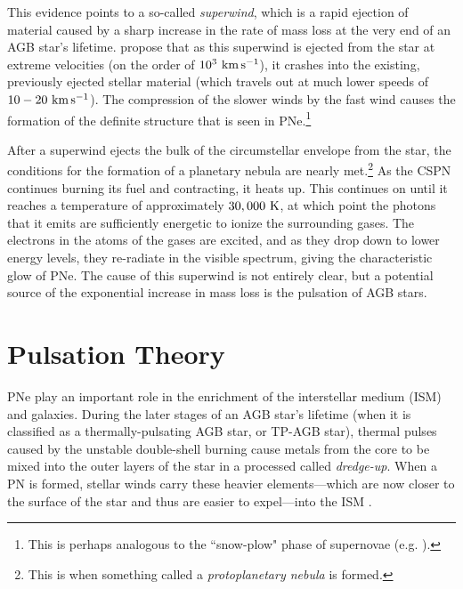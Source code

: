 \documentclass[twocolumn]{aastex63}
\begin{document}
This evidence points to a so-called \textit{superwind}, which is a rapid ejection of material caused by a sharp increase in the rate of mass loss at the very end of an AGB star's lifetime. \cite{kwok1978} propose that as this superwind is ejected from the star at extreme velocities (on the order of $10^{3}~{\rm km\,s^{-1}}$), it crashes into the existing, previously ejected stellar material (which travels out at much lower speeds of $10-20~{\rm km\,s^{-1}}$). The compression of the slower winds by the fast wind causes the formation of the definite structure that is seen in PNe.\footnote{This is perhaps analogous to the ``snow-plow" phase of supernovae (e.g. \cite{moriya, mccray}).}

After a superwind ejects the bulk of the circumstellar envelope from the star, the conditions for the formation of a planetary nebula are nearly met.\footnote{This is when something called a \textit{protoplanetary nebula} is formed.} As the CSPN continues burning its fuel and contracting, it heats up. This continues on until it reaches a temperature of approximately $30,000~{\rm K}$, at which point the photons that it emits are sufficiently energetic to ionize the surrounding gases. The electrons in the atoms of the gases are excited, and as they drop down to lower energy levels, they re-radiate in the visible spectrum, giving the characteristic glow of PNe. The cause of this superwind is not entirely clear, but a potential source of the exponential increase in mass loss is the pulsation of AGB stars. 



\section{Pulsation Theory} \label{sec:pulsation}
PNe play an important role in the enrichment of the interstellar medium (ISM) and galaxies. During the later stages of an AGB star's lifetime (when it is classified as a thermally-pulsating AGB star, or TP-AGB star), thermal pulses caused by the unstable double-shell burning cause metals from the core to be mixed into the outer layers of the star in a processed called \textit{dredge-up}. When a PN is formed, stellar winds carry these heavier elements—which are now closer to the surface of the star and thus are easier to expel—into the ISM \citep{iben}. 
\end{document}
